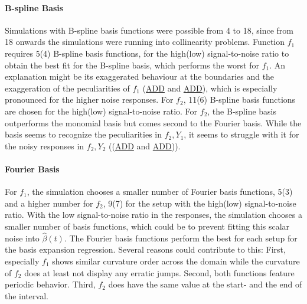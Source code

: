 \documentclass[11pt,twoside,a4paper]{article}
\begin{document}
	\paragraph{B-spline Basis}
	Simulations with B-spline basis functions were possible from 4 to 18, since from 18 onwards the simulations were running into collinearity problems.
	Function $f_1$ requires 5(4) B-spline basis functions, for the high(low) signal-to-noise ratio to obtain the best fit for the B-spline basis, which performs the worst for $f_1$. An explanation might be its exaggerated behaviour at the boundaries and the exaggeration of the peculiarities of $f_1$ (\hyperref[basis_expansion_1_1]{ADD} and \hyperref[basis_expansion_1_2]{ADD}), which is especially pronounced for the higher noise responses. For $f_2$, 11(6) B-spline basis functions are chosen for the high(low) signal-to-noise ratio. For $f_2$, the B-spline basis outperforms the monomial basis but comes second to the Fourier basis. While the basis seems to recognize the peculiarities in $f_2,Y_1$, it seems to struggle with it for the noisy responses in $f_2,Y_2$ ((\hyperref[basis_expansion_2_1]{ADD} and \hyperref[basis_expansion_2_2]{ADD})).
	\vspace{-0.2cm}
	
	\paragraph{Fourier Basis}
	For $f_1$, the simulation chooses a smaller number of Fourier basis functions, 5(3) and a higher number for $f_2$, 9(7) for the setup with the high(low) signal-to-noise ratio. With the low signal-to-noise ratio in the responses, the simulation chooses a smaller number of basis functions, which could be to prevent fitting this scalar noise into $\hat{\beta}(t)$. The Fourier basis functions perform the best for each setup for the basis expansion regression. Several reasons could contribute to this: First, especially $f_1$ shows similar curvature order across the domain while the curvature of $f_2$ does at least not display any erratic jumps. Second, both functions feature periodic behavior. Third, $f_2$ does have the same value at the start- and the end of the interval.	\\
	
\end{document}
